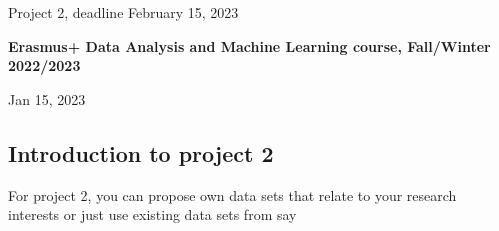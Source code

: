 \documentclass[%
oneside,                 %
final,                   %
10pt]{article}
\begin{document}

\newcommand{\exercisesection}[1]{\subsection*{#1}}






\thispagestyle{empty}

\begin{center}
{\LARGE\bf
\begin{spacing}{1.25}
Project 2, deadline February 15, 2023
\end{spacing}
}
\end{center}


\begin{center}
{\bf Erasmus+ Data Analysis and Machine Learning course, Fall/Winter 2022/2023${}^{}$} \\ [0mm]
\end{center}

\begin{center}
\end{center}
    

\begin{center}
Jan 15, 2023
\end{center}

\vspace{1cm}


\subsection{Introduction to project 2}

For project 2, you can propose own data sets that relate to your
research interests or just use existing data sets from say
\end{document}
